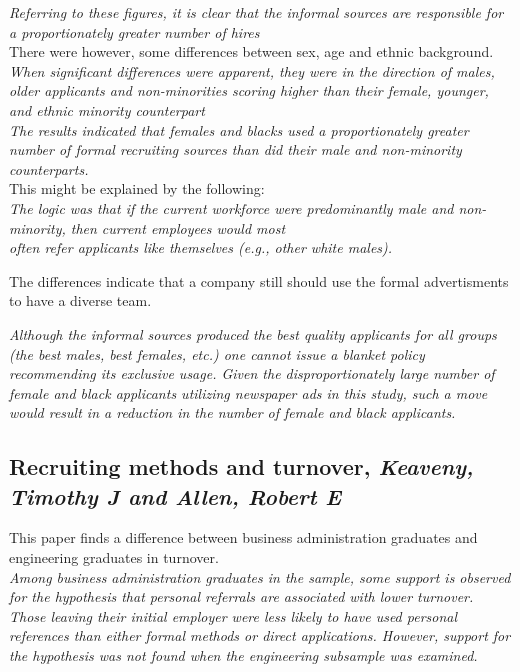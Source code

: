 \documentclass[a4paper, 11pt]{article} %
\begin{document}
\emph{Referring to these figures, it is clear that the informal sources are
responsible for a proportionately greater number of hires }\\

There were however, some differences between sex, age and ethnic background. \\

\emph{When significant differences were apparent, they were in
the direction of males, older applicants and non-minorities scoring higher
than their female, younger, and ethnic minority counterpart}\\

\emph{The results indicated that females and blacks
used a proportionately greater number of formal recruiting sources than did
their male and non-minority counterparts.}\\

This might be explained by the following:\\
\emph{The logic was that if the current workforce were
predominantly male and non-minority, then current employees would most\\
often refer applicants like themselves (e.g., other white males).}

The differences indicate that a company still should use the formal advertisments to have a diverse team. 

\emph{Although
the informal sources produced the best quality applicants for all groups (the
best males, best females, etc.) one cannot issue a blanket policy recommending its exclusive usage. Given the disproportionately large number
of female and black applicants utilizing newspaper ads in this study, such
a move would result in a reduction in the number of female and black
applicants.}\\


\subsection*{Recruiting methods and turnover, \emph{Keaveny, Timothy J and Allen, Robert E} \cite{eleventh}}
This paper finds a difference between business administration graduates and engineering graduates in turnover.\\

\emph{Among business administration graduates in the sample, 
some support is observed for the hypothesis that personal referrals 
are associated with lower turnover. Those leaving their initial 
employer were less likely to have used personal references than 
either formal methods or direct applications. However, support for 
the hypothesis was not found when the engineering subsample was 
examined.}\\
\end{document}
